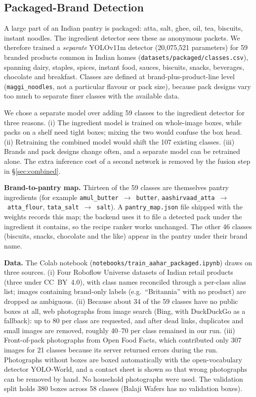 \documentclass[journal]{IEEEtran}
\begin{document}
\subsection{Packaged-Brand Detection}
\label{sec:packaged}

A large part of an Indian pantry is packaged: atta, salt, ghee, oil,
tea, biscuits, instant noodles. The ingredient detector sees these as
anonymous packets. We therefore trained a \emph{separate} YOLOv11m
detector (20{,}075{,}521 parameters) for 59 branded products common
in Indian homes (\texttt{datasets/packaged/classes.csv}), spanning
dairy, staples, spices, instant food, sauces, biscuits, snacks,
beverages, chocolate and breakfast. Classes are defined at
brand-plus-product-line level (\texttt{maggi\_noodles}, not a
particular flavour or pack size), because pack designs vary too much
to separate finer classes with the available data.

We chose a separate model over adding 59 classes to the ingredient
detector for three reasons. (i) The ingredient model is trained on
whole-image boxes, while packs on a shelf need tight boxes; mixing
the two would confuse the box head. (ii) Retraining the combined
model would shift the 107 existing classes. (iii) Brands and pack
designs change often, and a separate model can be retrained alone.
The extra inference cost of a second network is removed by the fusion
step in \S\ref{sec:combined}.

\textbf{Brand-to-pantry map.} Thirteen of the 59 classes are
themselves pantry ingredients (for example
\texttt{amul\_butter}~$\rightarrow$~\texttt{butter},
\texttt{aashirvaad\_atta}~$\rightarrow$~\texttt{atta\_flour},
\texttt{tata\_salt}~$\rightarrow$~\texttt{salt}). A
\texttt{pantry\_map.json} file shipped with the weights records this
map; the backend uses it to file a detected pack under the
ingredient it contains, so the recipe ranker works unchanged. The
other 46 classes (biscuits, snacks, chocolate and the like) appear in
the pantry under their brand name.

\textbf{Data.} The Colab notebook
(\texttt{notebooks/train\_aahar\_packaged.ipynb}) draws on three
sources. (i) Four Roboflow Universe datasets of Indian retail
products (three under CC~BY~4.0), with class names reconciled through
a per-class alias list; images containing brand-only labels (e.g.\
``Britannia'' with no product) are dropped as ambiguous. (ii) Because
about 34 of the 59 classes have no public boxes at all, web
photographs from image search (Bing, with DuckDuckGo as a fallback):
up to 80 per class are requested, and after dead links, duplicates
and small images are removed, roughly 40--70 per class remained in
our run. (iii) Front-of-pack photographs from Open Food Facts, which
contributed only 307 images for 21 classes because its server
returned errors during the run. Photographs without boxes are boxed
automatically with the open-vocabulary detector YOLO-World, and a
contact sheet is shown so that wrong photographs can be removed by
hand. No household photographs were used. The validation split
holds 380 boxes across 58 classes (Balaji Wafers has no validation
boxes).
\end{document}
